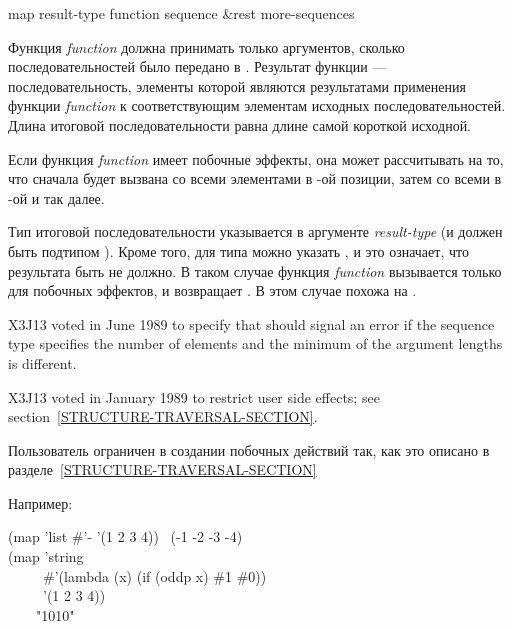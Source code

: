 \begin{defun}[Функция]
map result-type function sequence &rest more-sequences

Функция \emph{function} должна принимать только аргументов, сколько
последовательностей было передано в . 
Результат функции  --- последовательность, элементы которой являются
результатами применения функции \emph{function} к соответствующим элементам
исходных последовательностей. Длина итоговой последовательности равна длине
самой короткой исходной.

Если функция \emph{function} имеет побочные эффекты, она может рассчитывать на
то, что сначала будет вызвана со всеми элементами в -ой позиции, затем со
всеми в -ой и так далее.

Тип итоговой последовательности указывается в аргументе \emph{result-type} (и
должен быть подтипом ).
Кроме того, для типа можно указать {\nil}, и это означает, что результата быть
не должно. В таком случае функция \emph{function} вызывается только для побочных
эффектов, и  возвращает {\nil}. В этом случае  похожа на
.

\begin{newer}
X3J13 voted in June 1989  to specify that
 should signal an error if the sequence type specifies the number of
elements and the minimum of the argument lengths is different.
\end{newer}

\begin{new}
X3J13 voted in January 1989
to restrict user side effects; see section~\ref{STRUCTURE-TRAVERSAL-SECTION}.
\end{new}

Пользователь ограничен в создании побочных действий так, как это описано в
разделе~\ref{STRUCTURE-TRAVERSAL-SECTION}

Например:
\begin{lisp}
(map 'list \#'- '(1 2 3 4)) \EV\ (-1 -2 -3 -4) \\
(map 'string \\
~~~~~\#'(lambda (x) (if (oddp x) \#{\Xbackslash}1 \#{\Xbackslash}0)) \\
~~~~~'(1 2 3 4)) \\
~~~\EV\ "1010"
\end{lisp}
\end{defun}


